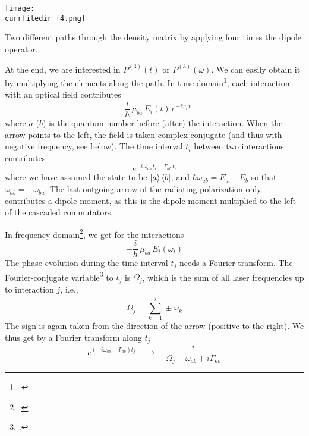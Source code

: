 \begin{marginfigure}
\texttt{[image: \\currfiledir f4.png]}
\caption{
Two different paths  through the density matrix by applying four times the dipole operator.}
\label{fig_2d_path}
\end{marginfigure}

At the end, we are interested in $P^{(3)}(t)$ or $P^{(3)}(\omega)$. We can easily obtain it by multiplying the elements along the path. In time domain\footcite{Mukamel1995,HammZanni2011,Hamm-dummies}, each interaction with an optical field contributes
\begin{equation}
 - \frac{i}{\hbar} \, \mu_{ba} \, E_i(t)  \, e^{-i \omega_i \, t}
\end{equation}
where $a$ ($b$) is the quantum number before (after) the interaction. When the arrow points to the left, the field is taken complex-conjugate (and thus with negative frequency, see below). The time interval $t_i$ between two interactions contributes 
%
\begin{equation}
 e^{-i \, \omega_{ab} \, t_i - \Gamma_{ab} \, t_i}
\end{equation}
%
where we have assumed the state to be $\ket{a} \bra{b}$, and 
$\hbar \omega_{ab} = E_a - E_b$ so that $\omega_{ab}  = - \omega_{ba} $. The last outgoing arrow of the radiating polarization only contributes a dipole moment, as this is the dipole moment multiplied to the left of the cascaded commutators.

In frequency domain\footcite{Boyd2008,Shen2003}, we get for the interactions
\begin{equation}
 - \frac{i}{\hbar} \, \mu_{ba} \, E_i(\omega_i)  
\end{equation}
The phase evolution during the time interval $t_j$ needs a Fourier transform. 
The Fourier-conjugate variable\footcite{Tokmakoff09} to $t_j$  is $\Omega_j$, which is the sum of all laser frequencies up to interaction $j$, i.e.,
\begin{equation}
 \Omega_j = \sum_{k=1}^j \pm \omega_k
\end{equation}
The sign is again taken from the direction of the arrow (positive to the right). We thus get
 by a Fourier transform  along $t_j$ 
\begin{equation}
 e^{ (-i \omega_{ab} - \Gamma_{ab}) t_j }  \quad \rightarrow \quad
 \frac{i }{\Omega_j - \omega_{ab}  + i \Gamma_{ab} } 
\end{equation}




